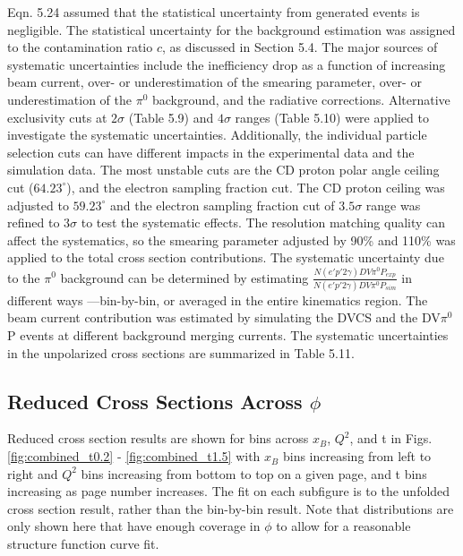         
        Eqn. 5.24 assumed that the statistical uncertainty from generated events is negligible.
        The statistical uncertainty for the background estimation was assigned to the
        contamination ratio $c$, as discussed in Section 5.4.
        The major sources of systematic uncertainties include the inefficiency drop as a
        function of increasing beam current, over- or underestimation of the smearing parameter,
        over- or underestimation of the $\pi^0$ background, and the radiative corrections.
        Alternative exclusivity cuts at $2\sigma$ (Table 5.9) and $4\sigma$ ranges (Table 5.10) were applied
        to investigate the systematic uncertainties. Additionally, the individual particle
        selection cuts can have different impacts in the experimental data and the simulation
        data. The most unstable cuts are the CD proton polar angle ceiling cut ($64.23^\circ$), and
        the electron sampling fraction cut. The CD proton ceiling was adjusted to $59.23^\circ$
        and the electron sampling fraction cut of $3.5\sigma$ range was refined to $3\sigma$ to test the
        systematic effects. The resolution matching quality can affect the systematics, so the
        smearing parameter adjusted by 90\% and 110\% was applied to the total cross section
        contributions. The systematic uncertainty due to the $\pi^0$ background can be determined
        by estimating $\frac{N(e'p'2\gamma)DV\pi^0P_{exp}}{N(e'p'2\gamma)DV\pi^0P_{sim}}$
        in different ways ---bin-by-bin, or averaged in the
        entire kinematics region. The beam current contribution was estimated by simulating
        the DVCS and the DV$\pi^0$P events at different background merging currents.
        The systematic uncertainties in the unpolarized cross sections are summarized in
        Table 5.11.
        


    \subsection{Reduced Cross Sections Across \texorpdfstring{$\phi$}{Phi}}
    
        Reduced cross section results are shown for bins across $x_B$, $Q^2$, and t in Figs. \ref{fig:combined_t0.2} - \ref{fig:combined_t1.5} with $x_B$ bins increasing from left to right and $Q^2$ bins increasing from bottom to top on a given page, and t bins increasing as page number increases. The fit on each subfigure is to the unfolded cross section result, rather than the bin-by-bin result. Note that distributions are only shown here that have enough coverage in $\phi$ to allow for a reasonable structure function curve fit. %
        
